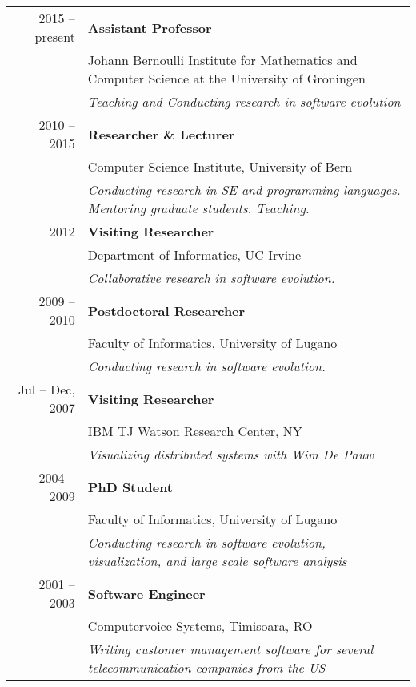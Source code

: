 \newcommand{\job}[4]{#1 & {\bf #3}\\ & #2\\  &{\small \em#4} \vspace{0.5em} \\}



\begin{tabular}{r p{8cm}}

	\job
	{2015 -- present}
	{Johann Bernoulli Institute for Mathematics and Computer Science at the University of Groningen}
	{Assistant Professor}
	{Teaching and Conducting research in software evolution}

	\job
	{2010 -- 2015}
	{Computer Science Institute, University of Bern}
	{Researcher \& Lecturer}
	{
	Conducting research in SE and programming languages. Mentoring graduate students. Teaching.}

	\job
	{2012}
	{Department of Informatics, UC Irvine}
	{Visiting Researcher}
	{Collaborative research in software evolution. 
	}


	\job
	{2009 -- 2010}
	{Faculty of Informatics, University of Lugano}
	{Postdoctoral Researcher}
	{Conducting research in software evolution. }

	\job 
	{Jul -- Dec, 2007}
	{IBM TJ Watson Research Center, NY}
	{Visiting Researcher}
	{Visualizing distributed systems with Wim De Pauw}


	\job 
	{2004 -- 2009}
	{Faculty of Informatics, University of Lugano}
	{PhD Student}
	{Conducting research in software evolution, visualization, and large scale software analysis}


	\job
	{2001 -- 2003}
	{Computervoice Systems, Timisoara, RO}
	{Software Engineer}
	{Writing customer management software for several telecommunication companies from the US}


\end{tabular}

